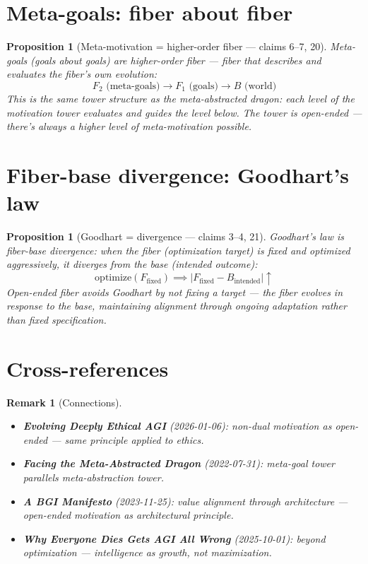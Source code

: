 \documentclass[11pt,a4paper]{article}
\newtheorem{proposition}[definition]{Proposition}
\newtheorem{remark}[definition]{Remark}
\begin{document}
\section{Meta-goals: fiber about fiber}

\begin{proposition}[Meta-motivation = higher-order fiber --- claims 6--7, 20]
Meta-goals (goals about goals) are higher-order fiber --- fiber that
describes and evaluates the fiber's own evolution:
\[
  F_2 \text{ (meta-goals)} \to F_1 \text{ (goals)} \to B \text{ (world)}
\]
This is the same tower structure as the meta-abstracted dragon: each
level of the motivation tower evaluates and guides the level below.
The tower is open-ended --- there's always a higher level of
meta-motivation possible.
\end{proposition}

\section{Fiber-base divergence: Goodhart's law}

\begin{proposition}[Goodhart = divergence --- claims 3--4, 21]
Goodhart's law is fiber-base divergence: when the fiber (optimization
target) is fixed and optimized aggressively, it diverges from the base
(intended outcome):
\[
  \text{optimize}(F_{\text{fixed}}) \implies
  |F_{\text{fixed}} - B_{\text{intended}}| \uparrow
\]
Open-ended fiber avoids Goodhart by not fixing a target --- the fiber
evolves in response to the base, maintaining alignment through
ongoing adaptation rather than fixed specification.
\end{proposition}

\section{Cross-references}

\begin{remark}[Connections]
\begin{itemize}
\item \textbf{Evolving Deeply Ethical AGI} (2026-01-06): non-dual
  motivation as open-ended --- same principle applied to ethics.
\item \textbf{Facing the Meta-Abstracted Dragon} (2022-07-31): meta-goal
  tower parallels meta-abstraction tower.
\item \textbf{A BGI Manifesto} (2023-11-25): value alignment through
  architecture --- open-ended motivation as architectural principle.
\item \textbf{Why Everyone Dies Gets AGI All Wrong} (2025-10-01):
  beyond optimization --- intelligence as growth, not maximization.
\end{itemize}
\end{remark}
\end{document}
